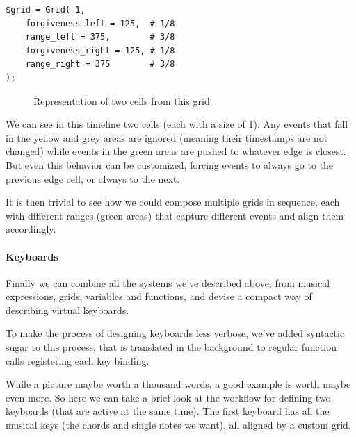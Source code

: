 \documentclass[a4paper,UKenglish,cleveref, autoref]{oasics-v2019}
\begin{document}
\begin{lstlisting}[caption={Declaring a grid with some additional optional parameters},label=list:8,captionpos=t,abovecaptionskip=-\medskipamount]
$grid = Grid( 1,
    forgiveness_left = 125,  # 1/8
    range_left = 375,        # 3/8
    forgiveness_right = 125, # 1/8
    range_right = 375        # 3/8
);
\end{lstlisting}

\begin{figure}[ht]
  \centering
  {%
  \setlength{\fboxsep}{0pt}%
  \setlength{\fboxrule}{0pt}%
  }%
  \caption{Representation of two cells from this grid.}
  \label{fig:grid}
\end{figure}

We can see in this timeline two cells (each with a size of 1). Any events that fall in the yellow and grey areas are ignored (meaning their timestamps are not changed) while events in the green areas are pushed to whatever edge is closest. But even this behavior can be customized, forcing events to always go to the previous edge cell, or always to the next.

It is then trivial to see how we could compose multiple grids in sequence, each with different ranges (green areas) that capture different events and align them accordingly.

\paragraph*{Keyboards}
Finally we can combine all the systems we've described above, from musical expressions, grids, variables and functions, and devise a compact way of describing virtual keyboards.

To make the process of designing keyboards less verbose, we've added syntactic sugar to this process, that is translated in the background to regular function calls registering each key binding.

While a picture maybe worth a thousand words, a good example is worth maybe even more. So here we can take a brief look at the workflow for defining two keyboards (that are active at the same time). The first keyboard has all the musical keys (the chords and single notes we want), all aligned by a custom grid.
\end{document}
